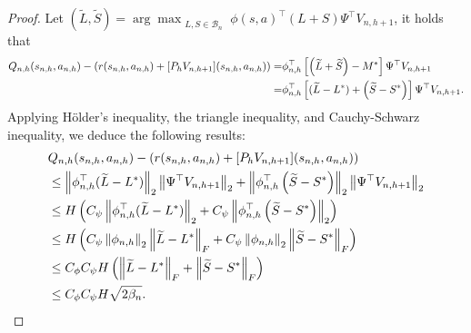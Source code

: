 \begin{proof}
Let $(\widetilde{ L},\widetilde{ S})=\arg\max_{\substack{ L, S \in \mathcal{B}_n}}\phi(s, a)^{\top} ( L+ S)  \Psi^{\top} V_{n, h+1}$, it holds that 
\begin{align*}
   Q_{n,h}(s_{n,h},a_{n,h})-\left( r(s_{n,h},a_{n,h})+[P_h V_{n,h+1}](s_{n,h},a_{n,h}) \right)
   =& \phi_{n, h}^{\top}\left[\left(\widetilde{ L} + \widetilde{ S}\right) - M^*\right]  \Psi^{\top} V_{n, h+1} \\
   = &\phi_{n, h}^{\top}\left[(\widetilde{ L}- L^*) + \left(\widetilde{ S}- S^{*}\right)\right]  \Psi^{\top} V_{n, h+1}.
    \end{align*}
        Applying Hölder's inequality, the triangle inequality, and Cauchy-Schwarz inequality, we deduce the following results:
     \begin{equation}
     \label{equ:one-step-analysis}
     \begin{aligned}
     &Q_{n,h}(s_{n,h},a_{n,h})-\left( r(s_{n,h},a_{n,h})+[P_h V_{n,h+1}](s_{n,h},a_{n,h}) \right) \\
     &\leq \left\lVert\phi_{n, h}^{\top}(\widetilde{ L} -  L^{*})\right\rVert_2\left\lVert \Psi^{\top} V_{n, h+1}\right\rVert_{2}+\left\lVert\phi_{n, h}^{\top}\left( \widetilde{ S} -  S^* \right)\right\rVert_2\left\lVert \Psi^{\top} V_{n, h+1}\right\rVert_{2} \\
     & \leq H\left( C_{\psi}\left\lVert\phi_{n, h}^{\top}(\widetilde{ L}-  L^*)\right\rVert_2+C_{\psi}\left\lVert\phi_{n, h}^{\top}\left( \widetilde{ S}-  S^{*} \right)\right\rVert_2 \right) \\
     & \leq H\left( C_{\psi}\left\lVert\phi_{n, h}\right\rVert_2\left\lVert\widetilde{ L} -  L^{*}\right\rVert_F + C_{\psi}\left\lVert\phi_{n, h}\right\rVert_2\left\lVert\widetilde{ S} -  S^{*}\right\rVert_F \right) \\
     & \leq C_{\phi}C_{\psi}H\left( \left\lVert\widetilde{ L} -  L^*\right\rVert_F + \left\lVert\widetilde{ S} -  S^{*}\right\rVert_F \right) \\
     & \leq C_{\phi}C_{\psi}H\sqrt{2\beta_n}.
     \end{aligned}
    \end{equation}
\end{proof}


